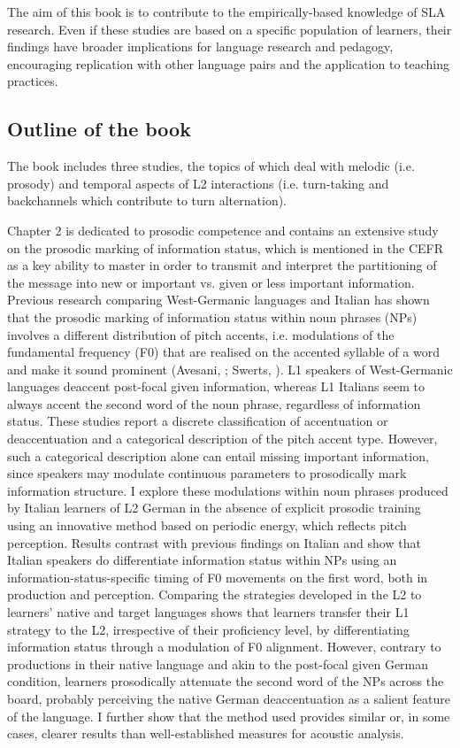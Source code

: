 The aim of this book is to contribute to the empirically-based knowledge of SLA research. Even if these studies are based on a specific population of learners, their findings have broader implications for language research and pedagogy, encouraging replication with other language pairs and the application to teaching practices.

\subsection{Outline of the book}
\hypertarget{Toc191305877}{}
The book includes three studies, the topics of which deal with melodic (i.e. prosody) and temporal aspects of L2 interactions (i.e. turn-taking and backchannels which contribute to turn alternation). 

Chapter 2 is dedicated to prosodic competence and contains an extensive study on the prosodic marking of information status, which is mentioned in the CEFR as a key ability to master in order to transmit and interpret the partitioning of the message into new or important vs. given or less important information. Previous research comparing West-Germanic languages and Italian has shown that the prosodic marking of information status within noun phrases (NPs) involves a different distribution of pitch accents, i.e. modulations of the fundamental frequency (F0) that are realised on the accented syllable of a word and make it sound prominent (Avesani, \citealt{BocciVayra2015}; Swerts, \citealt{KrahmerAvesani2002}). L1 speakers of West-Germanic languages deaccent post-focal given information, whereas L1 Italians seem to always accent the second word of the noun phrase, regardless of information status. These studies report a discrete classification of accentuation or deaccentuation and a categorical description of the pitch accent type. However, such a categorical description alone can entail missing important information, since speakers may modulate continuous parameters to prosodically mark information structure. I explore these modulations within noun phrases produced by Italian learners of L2 German in the absence of explicit prosodic training using an innovative method based on periodic energy, which reflects pitch perception. Results contrast with previous findings on Italian and show that Italian speakers do differentiate information status within NPs using an information-status-specific timing of F0 movements on the first word, both in production and perception. Comparing the strategies developed in the L2 to learners’ native and target languages shows that learners transfer their L1 strategy to the L2, irrespective of their proficiency level, by differentiating information status through a modulation of F0 alignment. However, contrary to productions in their native language and akin to the post-focal given German condition, learners prosodically attenuate the second word of the NPs across the board, probably perceiving the native German deaccentuation as a salient feature of the language. I further show that the method used provides similar or, in some cases, clearer results than well-established measures for acoustic analysis.

